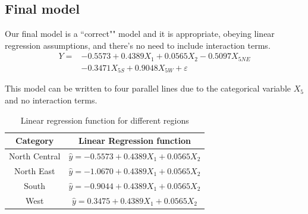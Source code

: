 \documentclass[a4paper,11pt,onecolumn,twoside]{article}
\begin{document}
\subsection{Final model}
Our final model is a ``correct"" model and it is appropriate, obeying linear regression assumptions, and there's no need to include interaction terms.
\begin{equation}
\begin{split}
Y= &-0.5573+0.4389X_1+0.0565X_2-0.5097X_{5NE}\\&-0.3471X_{5S}+0.9048X_{5W} +\varepsilon
\end{split}
\end{equation}
\par
This model can be written to four parallel lines due to the categorical variable $X_5$ and no interaction terms.
\begin{table}[H]
	\centering
	\begin{tabular}{cc}
		\midrule[1.5pt]	
		Category& Linear Regression function\\
		\hline    
		North Central&$\hat{y}=-0.5573+0.4389X_1+0.0565X_2$\\
		North East&$\hat{y}=-1.0670+0.4389X_1+0.0565X_2$\\
		South&$\hat{y}=-0.9044+0.4389X_1+0.0565X_2$\\
		West&$\hat{y}=0.3475+0.4389X_1+0.0565X_2$\\
		\midrule[1.5pt]
	\end{tabular}
	\caption{Linear regression function for different regions}
\end{table}
\end{document}

